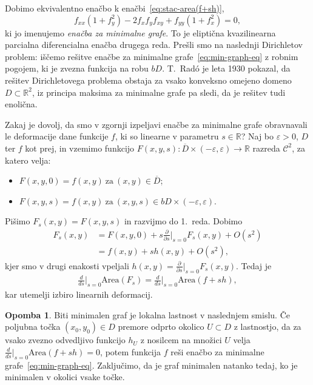\documentclass[12pt,a4paper,twoside]{article}
\theoremstyle{definition} %
\newtheorem{opomba}[definicija]{Opomba}
\theoremstyle{plain} %
\numberwithin{equation}{section}  %
\newcommand{\R}{\mathbb R}
\begin{document}
Dobimo ekvivalentno enačbo k enačbi~\eqref{eq:stac-area(f+sh)},
\begin{equation} \label{eq:min-graph-eq}
f_{xx}(1+f_{y}^2) - 2f_{x}f_{y}f_{xy} + f_{yy}(1+f_{x}^2) = 0,
\end{equation}
ki jo imenujemo \emph{enačba za minimalne grafe}.
To je eliptična kvazilinearna parcialna diferencialna enačba drugega reda. \newline
Prešli smo na naslednji Dirichletov problem: iščemo rešitve enačbe za minimalne grafe~\eqref{eq:min-graph-eq} z robnim pogojem, ki je zvezna funkcija na robu $bD$.
T.~Rad\'o je leta 1930 pokazal, da rešitev Dirichletovega problema obstaja za vsako konveksno omejeno domeno $D \subset \R^2$, iz principa maksima za minimalne grafe pa sledi, da je rešitev tudi enolična.

Zakaj je dovolj, da smo v zgornji izpeljavi enačbe za minimalne grafe obravnavali le deformacije dane funkcije $f$, ki so linearne v parametru $s \in \R$? \newline
Naj bo $\varepsilon > 0$, $D$ ter $f$ kot prej, in vzemimo funkcijo $F(x,y,s) \colon \overline{D} \times (-\varepsilon, \varepsilon) \to \R$ razreda $\mathcal{C}^2$, za katero velja:
\begin{itemize}
\item $ F(x,y,0) = f(x,y) \ \text{za} \ (x,y) \in \overline{D}$;
\item $ F(x,y,s) = f(x,y) \ \text{za} \ (x,y,s) \in bD \times (-\varepsilon, \varepsilon)$.
\end{itemize}
Pišimo $F_{s}(x,y) = F(x,y,s)$ in razvijmo do 1.~reda. Dobimo
\begin{align*}
F_{s}(x,y) &= F(x,y,0) + s \frac{\partial}{\partial s} \Big|_{s=0}F_{s}(x,y) + O(s^2) \\
	&= f(x,y) + s h(x,y) + O(s^2),
\end{align*}
kjer smo v drugi enakosti vpeljali $h(x,y)= \frac{\partial}{\partial s} \big|_{s=0}F_{s}(x,y)$. Tedaj je
\begin{gather*}
\frac{d}{ds} \Big|_{s=0} \text{Area}(F_{s}) = \frac{d}{ds} \Big|_{s=0} \text{Area}(f+sh),
\end{gather*}
kar utemelji izbiro linearnih deformacij.

\begin{opomba}
Biti minimalen graf je lokalna lastnost v naslednjem smislu.
Če poljubna točka $(x_0,y_0) \in D$ premore odprto okolico $U \subset D$ z lastnostjo, da za vsako zvezno odvedljivo funkcijo $h_{U}$ z nosilcem na množici $U$  velja $\frac{d}{ds} \big|_{s=0} \text{Area}(f+sh) = 0$, potem funkcija $f$ reši enačbo za minimalne grafe~\eqref{eq:min-graph-eq}.
Zaključimo, da je graf minimalen natanko tedaj, ko je minimalen v okolici vsake točke.
\end{opomba}
\end{document}
